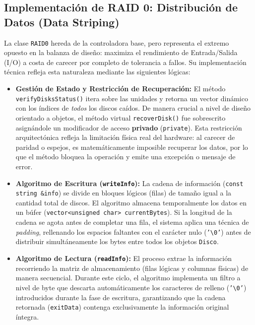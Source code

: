 \documentclass[12pt, a4paper]{article}
\begin{document}
\subsection{Implementación de RAID 0: Distribución de Datos (Data Striping)}

La clase \texttt{RAID0} hereda de la controladora base, pero representa el extremo opuesto en la balanza de diseño: maximiza el rendimiento de Entrada/Salida (I/O) a costa de carecer por completo de tolerancia a fallos. Su implementación técnica refleja esta naturaleza mediante las siguientes lógicas:

\begin{itemize}
    \item \textbf{Gestión de Estado y Restricción de Recuperación:} El método \texttt{verifyDisksStatus()} itera sobre las unidades y retorna un vector dinámico con los índices de \textit{todos} los discos caídos. De manera crucial a nivel de diseño orientado a objetos, el método virtual \texttt{recoverDisk()} fue sobrescrito asignándole un modificador de acceso \textbf{privado} (\texttt{private}). Esta restricción arquitectónica refleja la limitación física real del hardware: al carecer de paridad o espejos, es matemáticamente imposible recuperar los datos, por lo que el método bloquea la operación y emite una excepción o mensaje de error.

    \item \textbf{Algoritmo de Escritura (\texttt{writeInfo}):} La cadena de información (\texttt{const string \&info}) se divide en bloques lógicos (filas) de tamaño igual a la cantidad total de discos. El algoritmo almacena temporalmente los datos en un búfer (\texttt{vector<unsigned char> currentBytes}). Si la longitud de la cadena se agota antes de completar una fila, el sistema aplica una técnica de \textit{padding}, rellenando los espacios faltantes con el carácter nulo (\texttt{'\textbackslash0'}) antes de distribuir simultáneamente los bytes entre todos los objetos \texttt{Disco}.

    \item \textbf{Algoritmo de Lectura (\texttt{readInfo}):} El proceso extrae la información recorriendo la matriz de almacenamiento (filas lógicas y columnas físicas) de manera secuencial. Durante este ciclo, el algoritmo implementa un filtro a nivel de byte que descarta automáticamente los caracteres de relleno (\texttt{'\textbackslash0'}) introducidos durante la fase de escritura, garantizando que la cadena retornada (\texttt{exitData}) contenga exclusivamente la información original íntegra.
\end{itemize}
\end{document}

